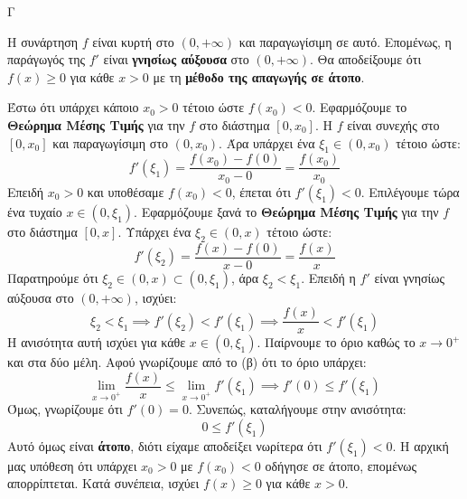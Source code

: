 \begin{thema}{Γ}
\begin{erwthma}
\item Η συνάρτηση $f$ είναι κυρτή στο $(0, +\infty)$ και παραγωγίσιμη σε αυτό. Επομένως, η παράγωγός της $f'$ είναι \textbf{γνησίως αύξουσα} στο $(0, +\infty)$.
Θα αποδείξουμε ότι $f(x) \ge 0$ για κάθε $x > 0$ με τη \textbf{μέθοδο της απαγωγής σε άτοπο}.

Έστω ότι υπάρχει κάποιο $x_0 > 0$ τέτοιο ώστε $f(x_0) < 0$.
Εφαρμόζουμε το \textbf{Θεώρημα Μέσης Τιμής} για την $f$ στο διάστημα $[0, x_0]$. Η $f$ είναι συνεχής στο $[0, x_0]$ και παραγωγίσιμη στο $(0, x_0)$. Άρα υπάρχει ένα $\xi_1 \in (0, x_0)$ τέτοιο ώστε:
\[ f'(\xi_1) = \frac{f(x_0) - f(0)}{x_0 - 0} = \frac{f(x_0)}{x_0} \]
Επειδή $x_0 > 0$ και υποθέσαμε $f(x_0) < 0$, έπεται ότι $f'(\xi_1) < 0$.
Επιλέγουμε τώρα ένα τυχαίο $x \in (0, \xi_1)$.
Εφαρμόζουμε ξανά το \textbf{Θεώρημα Μέσης Τιμής} για την $f$ στο διάστημα $[0, x]$. 
Υπάρχει ένα $\xi_2 \in (0, x)$ τέτοιο ώστε:
\[ f'(\xi_2) = \frac{f(x) - f(0)}{x - 0} = \frac{f(x)}{x} \]
Παρατηρούμε ότι $\xi_2 \in (0, x) \subset (0, \xi_1)$, άρα $\xi_2 < \xi_1$.
Επειδή η $f'$ είναι γνησίως αύξουσα στο $(0, +\infty)$, ισχύει:
\[ \xi_2 < \xi_1 \implies f'(\xi_2) < f'(\xi_1) \implies \frac{f(x)}{x} < f'(\xi_1) \]
Η ανισότητα αυτή ισχύει για κάθε $x \in (0, \xi_1)$. 
Παίρνουμε το όριο καθώς το $x \to 0^+$ και στα δύο μέλη. Αφού γνωρίζουμε από το (β) ότι το όριο υπάρχει:
\[ \lim_{x \to 0^+} \frac{f(x)}{x} \le \lim_{x \to 0^+} f'(\xi_1) \implies f'(0) \le f'(\xi_1) \]
Όμως, γνωρίζουμε ότι $f'(0) = 0$. Συνεπώς, καταλήγουμε στην ανισότητα:
\[ 0 \le f'(\xi_1) \]
Αυτό όμως είναι \textbf{άτοπο}, διότι είχαμε αποδείξει νωρίτερα ότι $f'(\xi_1) < 0$.
Η αρχική μας υπόθεση ότι υπάρχει $x_0 > 0$ με $f(x_0) < 0$ οδήγησε σε άτοπο, επομένως απορρίπτεται.
Κατά συνέπεια, ισχύει $f(x) \ge 0$ για κάθε $x > 0$.
\end{erwthma}
\end{thema}


